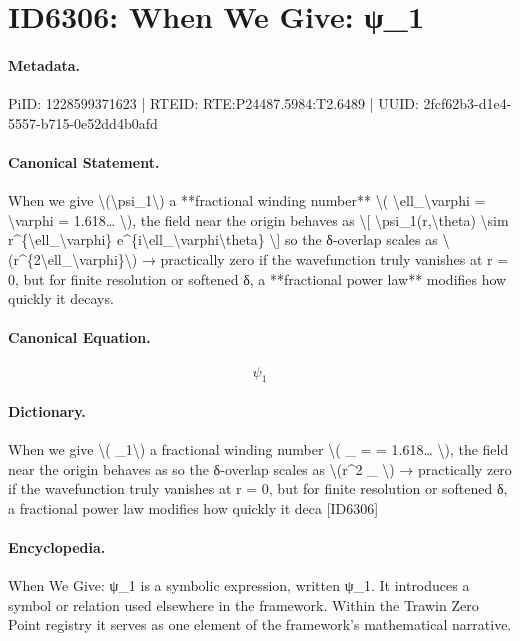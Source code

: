 \section*{ID6306: When We Give: ψ\_1}
\paragraph{Metadata.}
PiID: 1228599371623 | RTEID: RTE:P24487.5984:T2.6489 | UUID: 2fcf62b3-d1e4-5557-b715-0e52dd4b0afd

\paragraph{Canonical Statement.}
When we give \textbackslash{}(\textbackslash{}psi\_1\textbackslash{}) a **fractional winding number** \textbackslash{}( \textbackslash{}ell\_\textbackslash{}varphi = \textbackslash{}varphi = 1.618… \textbackslash{}), the field near the origin behaves as \textbackslash{}[ \textbackslash{}psi\_1(r,\textbackslash{}theta) \textbackslash{}sim r\textasciicircum{}\{\textbackslash{}ell\_\textbackslash{}varphi\} e\textasciicircum{}\{i\textbackslash{}ell\_\textbackslash{}varphi\textbackslash{}theta\} \textbackslash{}] so the δ-overlap scales as \textbackslash{}(r\textasciicircum{}\{2\textbackslash{}ell\_\textbackslash{}varphi\}\textbackslash{}) → practically zero if the wavefunction truly vanishes at r = 0, but for finite resolution or softened δ, a **fractional power law** modifies how quickly it decays.

\paragraph{Canonical Equation.}
\[
\psi_1
\]

\paragraph{Dictionary.}
When we give \textbackslash{}( \_1\textbackslash{}) a fractional winding number \textbackslash{}( \_ = = 1.618… \textbackslash{}), the field near the origin behaves as so the δ-overlap scales as \textbackslash{}(r\textasciicircum{}2 \_ \textbackslash{}) → practically zero if the wavefunction truly vanishes at r = 0, but for finite resolution or softened δ, a fractional power law modifies how quickly it deca [ID6306]

\paragraph{Encyclopedia.}
When We Give: ψ\_1 is a symbolic expression, written ψ\_1. It introduces a symbol or relation used elsewhere in the framework. Within the Trawin Zero Point registry it serves as one element of the framework's mathematical narrative.
